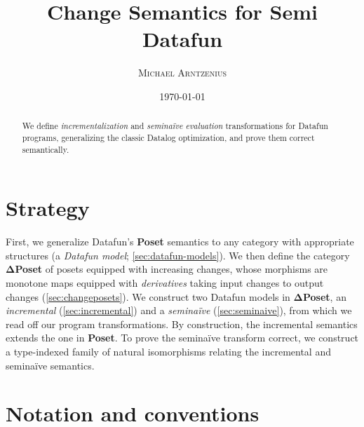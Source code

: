 \documentclass{rntz}\usepackage[a5]{rntzgeometry}\usepackage[fullwidth=130mm,width=330pt,]{narrow}
\title{Change Semantics for Semi\naive{} Datafun}
\author{\scshape Michael Arntzenius}
\date{\today}
\newcommand\naive{na\"ive}
\newcommand\cat\textbf
\newcommand\CP{\cat{\texorpdfstring{$\boldsymbol\Delta$Poset}{DeltaPoset}}}
\newcommand\Poset{\cat{Poset}}
\newcommand\<{\mskip 4mu plus 4mu minus 1mu}
\begin{document}
\maketitle

\begin{abstract}
  We define \emph{incrementalization} and \emph{semi\naive{} evaluation}
  transformations for Datafun programs, generalizing the classic Datalog
  optimization, and prove them correct semantically.%
\end{abstract}


\section{Strategy}

First, we generalize Datafun's \Poset{} semantics to any category with
appropriate structures (a \emph{Datafun model}; \cref{sec:datafun-models}). We
then define the category \CP{} of posets equipped with increasing changes, whose
morphisms are monotone maps equipped with \emph{derivatives} taking input
changes to output changes (\cref{sec:changeposets}). We construct two Datafun
models in \CP{}, an \emph{incremental} (\cref{sec:incremental}) and a
\emph{semi\naive} (\cref{sec:seminaive}), from which we read off our program
transformations. By construction, the incremental semantics extends the one in
\Poset{}. To prove the semi\naive{} transform correct, we construct a
type-indexed family of natural isomorphisms relating the incremental and
semi\naive{} semantics.



\section{Notation and conventions}
\end{document}
